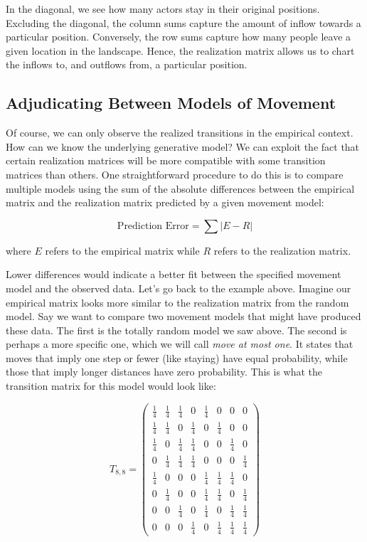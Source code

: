 \documentclass[
  11pt,
]{article}
\begin{document}
In the diagonal, we see how many actors stay in their original
positions. Excluding the diagonal, the column sums capture the amount of
inflow towards a particular position. Conversely, the row sums capture
how many people leave a given location in the landscape. Hence, the
realization matrix allows us to chart the inflows to, and outflows from,
a particular position.

\hypertarget{adjudicating-between-models-of-movement}{%
\subsection{Adjudicating Between Models of
Movement}\label{adjudicating-between-models-of-movement}}

Of course, we can only observe the realized transitions in the empirical
context. How can we know the underlying generative model? We can exploit
the fact that certain realization matrices will be more compatible with
some transition matrices than others. One straightforward procedure to
do this is to compare multiple models using the sum of the absolute
differences between the empirical matrix and the realization matrix
predicted by a given movement model:

\[
\text{Prediction Error} = \sum|E-R|
\]

where \(E\) refers to the empirical matrix while \(R\) refers to the
realization matrix.

Lower differences would indicate a better fit between the specified
movement model and the observed data. Let's go back to the example
above. Imagine our empirical matrix looks more similar to the
realization matrix from the random model. Say we want to compare two
movement models that might have produced these data. The first is the
totally random model we saw above. The second is perhaps a more specific
one, which we will call \emph{move at most one}. It states that moves
that imply one step or fewer (like staying) have equal probability,
while those that imply longer distances have zero probability. This is
what the transition matrix for this model would look like:

\[
T_{8,8} =
\begin{pmatrix}
\frac{1}{4} & \frac{1}{4} & \frac{1}{4} & 0 & \frac{1}{4} & 0 & 0 & 0  \\
\frac{1}{4} & \frac{1}{4} & 0 & \frac{1}{4} & 0 & \frac{1}{4} & 0 & 0  \\
\frac{1}{4} & 0 & \frac{1}{4} & \frac{1}{4} & 0 & 0 & \frac{1}{4} & 0  \\
0 & \frac{1}{4} & \frac{1}{4} & \frac{1}{4} & 0 & 0 & 0 & \frac{1}{4}  \\
\frac{1}{4} & 0 & 0 & 0 & \frac{1}{4} & \frac{1}{4} & \frac{1}{4} & 0  \\
0 & \frac{1}{4} & 0 & 0 & \frac{1}{4} & \frac{1}{4} & 0 & \frac{1}{4}  \\
0 & 0 & \frac{1}{4} & 0 & \frac{1}{4} & 0 & \frac{1}{4} & \frac{1}{4}  \\
0 & 0 & 0 & \frac{1}{4} & 0 & \frac{1}{4} & \frac{1}{4} & \frac{1}{4} 
\end{pmatrix}
\]
\end{document}
